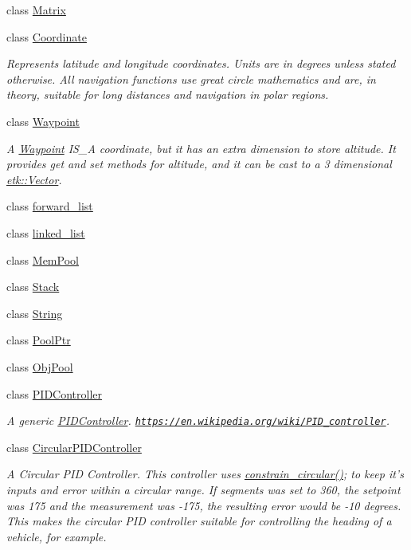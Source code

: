 \begin{DoxyCompactItemize}
class \hyperlink{classetk_1_1_matrix}{Matrix}
\item 
class \hyperlink{classetk_1_1_coordinate}{Coordinate}
\begin{DoxyCompactList}\small\item\em Represents latitude and longitude coordinates. Units are in degrees unless stated otherwise. All navigation functions use great circle mathematics and are, in theory, suitable for long distances and navigation in polar regions. \end{DoxyCompactList}\item 
class \hyperlink{classetk_1_1_waypoint}{Waypoint}
\begin{DoxyCompactList}\small\item\em A \hyperlink{classetk_1_1_waypoint}{Waypoint} I\-S\-\_\-\-A coordinate, but it has an extra dimension to store altitude. It provides get and set methods for altitude, and it can be cast to a 3 dimensional \hyperlink{classetk_1_1_vector}{etk\-::\-Vector}. \end{DoxyCompactList}\item 
class \hyperlink{classetk_1_1forward__list}{forward\-\_\-list}
\item 
class \hyperlink{classetk_1_1linked__list}{linked\-\_\-list}
\item 
class \hyperlink{classetk_1_1_mem_pool}{Mem\-Pool}
\item 
class \hyperlink{classetk_1_1_stack}{Stack}
\item 
class \hyperlink{classetk_1_1_string}{String}
\item 
class \hyperlink{classetk_1_1_pool_ptr}{Pool\-Ptr}
\item 
class \hyperlink{classetk_1_1_obj_pool}{Obj\-Pool}
\item 
class \hyperlink{classetk_1_1_p_i_d_controller}{P\-I\-D\-Controller}
\begin{DoxyCompactList}\small\item\em A generic \hyperlink{classetk_1_1_p_i_d_controller}{P\-I\-D\-Controller}. \href{https://en.wikipedia.org/wiki/PID_controller}{\tt https\-://en.\-wikipedia.\-org/wiki/\-P\-I\-D\-\_\-controller}. \end{DoxyCompactList}\item 
class \hyperlink{classetk_1_1_circular_p_i_d_controller}{Circular\-P\-I\-D\-Controller}
\begin{DoxyCompactList}\small\item\em A Circular P\-I\-D Controller. This controller uses \hyperlink{namespaceetk_a77f395cb44512ab4a95d08b01b3c7f20}{constrain\-\_\-circular()}; to keep it's inputs and error within a circular range. If segments was set to 360, the setpoint was 175 and the measurement was -\/175, the resulting error would be -\/10 degrees. This makes the circular P\-I\-D controller suitable for controlling the heading of a vehicle, for example. \end{DoxyCompactList}\item 

\end{DoxyCompactItemize}
